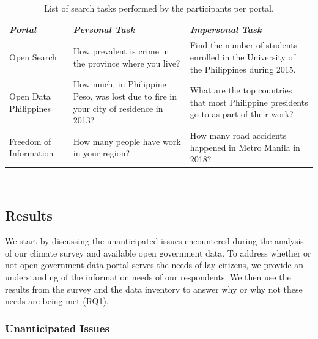 \documentclass{sigchi}
\begin{document}
\begin{table}[t]
  \centering
  \begin{tabular}{l p{6.5cm} p{6.5cm}}
    \toprule
    \textbf{\textit{Portal}}
    & \textbf{\textit{Personal Task}}
      & \textbf{\textit{Impersonal Task}}\\
    \midrule
    Open Search & How prevalent is crime in the province where you live? & Find the number of students enrolled in the University of the Philippines during 2015.\\
    \midrule
    Open Data Philippines & How much, in Philippine Peso,  was lost due to fire in your city of residence in 2013? & What are the top countries that most Philippine presidents go to as part of their work? \\
    \midrule
    Freedom of Information & How many people have work in your region? & How many road accidents happened in Metro Manila in 2018?\\
    \bottomrule
  \end{tabular}
  \caption{List of search tasks performed by the participants per portal.}~\label{tab:searchtasks}
\end{table}

\subsection{Results}
We start by discussing the unanticipated issues encountered during the analysis of our climate survey and available open government data. To address whether or not open government data portal serves the needs of lay citizens, we provide an understanding of the information needs of our respondents. We then use the results from the survey and the data inventory to answer why or why not these needs are being met (RQ1).

\subsubsection{Unanticipated Issues}
\end{document}
